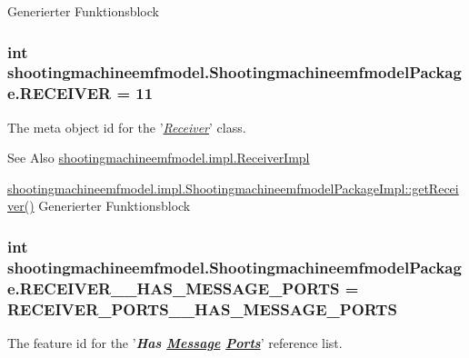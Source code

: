 Generierter Funktionsblock  \hypertarget{interfaceshootingmachineemfmodel_1_1_shootingmachineemfmodel_package_a4bedda5960870baa89368b22282164bc}{
\subsubsection[{R\-E\-C\-E\-I\-V\-E\-R}]{\setlength{\rightskip}{0pt plus 5cm}int shootingmachineemfmodel.\-Shootingmachineemfmodel\-Package.\-R\-E\-C\-E\-I\-V\-E\-R = 11}}\label{interfaceshootingmachineemfmodel_1_1_shootingmachineemfmodel_package_a4bedda5960870baa89368b22282164bc}
The meta object id for the '\hyperlink{classshootingmachineemfmodel_1_1impl_1_1_receiver_impl}{{\itshape Receiver}}' class.

\begin{DoxySeeAlso}{See Also}
\hyperlink{classshootingmachineemfmodel_1_1impl_1_1_receiver_impl}{shootingmachineemfmodel.\-impl.\-Receiver\-Impl} 

\hyperlink{classshootingmachineemfmodel_1_1impl_1_1_shootingmachineemfmodel_package_impl_a3a1f1115e25ffadf1e798560628d6535}{shootingmachineemfmodel.\-impl.\-Shootingmachineemfmodel\-Package\-Impl\-::get\-Receiver()} Generierter Funktionsblock 
\end{DoxySeeAlso}
\hypertarget{interfaceshootingmachineemfmodel_1_1_shootingmachineemfmodel_package_aab4c18e20b6251271bb3976894abd298}{
\subsubsection[{R\-E\-C\-E\-I\-V\-E\-R\-\_\-\-\_\-\-H\-A\-S\-\_\-\-M\-E\-S\-S\-A\-G\-E\-\_\-\-P\-O\-R\-T\-S}]{\setlength{\rightskip}{0pt plus 5cm}int shootingmachineemfmodel.\-Shootingmachineemfmodel\-Package.\-R\-E\-C\-E\-I\-V\-E\-R\-\_\-\-\_\-\-H\-A\-S\-\_\-\-M\-E\-S\-S\-A\-G\-E\-\_\-\-P\-O\-R\-T\-S = {\bf R\-E\-C\-E\-I\-V\-E\-R\-\_\-\-P\-O\-R\-T\-S\-\_\-\-\_\-\-H\-A\-S\-\_\-\-M\-E\-S\-S\-A\-G\-E\-\_\-\-P\-O\-R\-T\-S}}}\label{interfaceshootingmachineemfmodel_1_1_shootingmachineemfmodel_package_aab4c18e20b6251271bb3976894abd298}
The feature id for the '{\itshape {\bfseries Has \hyperlink{interfaceshootingmachineemfmodel_1_1_message}{Message} \hyperlink{interfaceshootingmachineemfmodel_1_1_ports}{Ports}}}' reference list.

